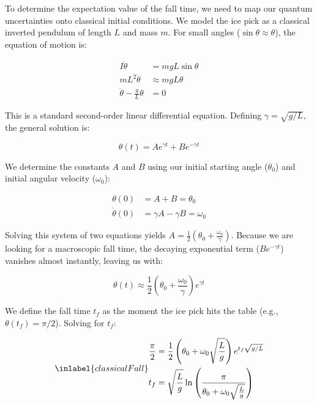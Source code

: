 
To determine the expectation value of the fall time, we need to map
  our quantum uncertainties onto classical initial conditions.  We
  model the ice pick as a classical inverted pendulum of length $L$
  and mass $m$.  For small angles ($\sin\theta \approx \theta$), the
  equation of motion is:

  \begin{equation}
    \begin{split}
      I \ddot{\theta} &= m g L \sin\theta \\
      m L^2 \ddot{\theta} &\approx m g L \theta \\
      \ddot{\theta} - \frac{g}{L} \theta &= 0
    \end{split}
  \end{equation}

  This is a standard second-order linear differential equation.
  Defining $\gamma = \sqrt{g/L}$, the general solution is:

  \begin{equation}
    \theta(t) = A e^{\gamma t} + B e^{-\gamma t}
  \end{equation}

  We determine the constants $A$ and $B$ using our initial starting
  angle ($\theta_0$) and initial angular velocity ($\omega_0$):

  \begin{equation}
    \begin{split}
      \theta(0) &= A + B = \theta_0 \\
      \dot{\theta}(0) &= \gamma A - \gamma B = \omega_0
    \end{split}
  \end{equation}

  Solving this system of two equations yields $A = \frac{1}{2}\left(\theta_0 + \frac{\omega_0}{\gamma}\right)$. 
  Because we are looking for a macroscopic fall time, the decaying 
  exponential term ($B e^{-\gamma t}$) vanishes almost instantly, leaving
  us with:

  \begin{equation}
    \theta(t) \approx \frac{1}{2}\left(\theta_0 + \frac{\omega_0}{\gamma}\right) e^{\gamma t}
  \end{equation}

  We define the fall time $t_f$ as the moment the ice pick hits the
  table (e.g., $\theta(t_f) = \pi/2$).  Solving for $t_f$:

  \begin{equation}
    \inlabel{classicalFall}
    \begin{split}
      \frac{\pi}{2} &= \frac{1}{2}\left(\theta_0 + \omega_0\sqrt{\frac{L}{g}}\right) e^{t_f \sqrt{g/L}} \\
      t_f &= \sqrt{\frac{L}{g}} \ln\left( \frac{\pi}{\theta_0 + \omega_0 \sqrt{\frac{L}{g}}} \right)
    \end{split}
  \end{equation}

